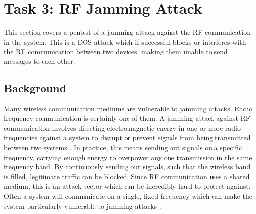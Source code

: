 \section{Task 3: RF Jamming Attack} \label{ch:pentesting:rf-jamming}
This section covers a pentest of a jamming attack against the RF communication in the system. This is a \gls{DOS} attack which if successful blocks or interferes with the RF communication between two devices, making them unable to send messages to each other.

\subsection{Background}
Many wireless communication mediums are vulnerable to jamming attacks. Radio frequency communication is certainly one of them. A jamming attack against RF communication involves directing electromagnetic energy in one or more radio frequencies against a system to disrupt or prevent signals from being transmitted between two systems \cite{adamy2004ew}. In practice, this means sending out signals on a specific frequency, carrying enough energy to overpower any one transmission in the same frequency band. By continuously sending out signals, such that the wireless band is filled, legitimate traffic can be blocked. Since RF communication uses a shared medium, this is an attack vector which can be incredibly hard to protect against. Often a system will communicate on a single, fixed frequency which can make the system particularly vulnerable to jamming attacks \cite{jamming-feasibility}.

